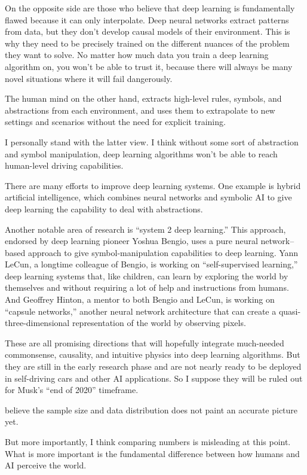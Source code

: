 On the opposite side are those who believe that deep learning is fundamentally flawed because it can only interpolate. Deep neural networks extract patterns from data, but they don’t develop causal models of their environment. This is why they need to be precisely trained on the different nuances of the problem they want to solve. No matter how much data you train a deep learning algorithm on, you won’t be able to trust it, because there will always be many novel situations where it will fail dangerously.

The human mind on the other hand, extracts high-level rules, symbols, and abstractions from each environment, and uses them to extrapolate to new settings and scenarios without the need for explicit training.

I personally stand with the latter view. I think without some sort of abstraction and symbol manipulation, deep learning algorithms won’t be able to reach human-level driving capabilities.

There are many efforts to improve deep learning systems. One example is hybrid artificial intelligence, which combines neural networks and symbolic AI to give deep learning the capability to deal with abstractions.

Another notable area of research is “system 2 deep learning.” This approach, endorsed by deep learning pioneer Yoshua Bengio, uses a pure neural network–based approach to give symbol-manipulation capabilities to deep learning. Yann LeCun, a longtime colleague of Bengio, is working on “self-supervised learning,” deep learning systems that, like children, can learn by exploring the world by themselves and without requiring a lot of help and instructions from humans. And Geoffrey Hinton, a mentor to both Bengio and LeCun, is working on “capsule networks,” another neural network architecture that can create a quasi-three-dimensional representation of the world by observing pixels.

These are all promising directions that will hopefully integrate much-needed commonsense, causality, and intuitive physics into deep learning algorithms. But they are still in the early research phase and are not nearly ready to be deployed in self-driving cars and other AI applications. So I suppose they will be ruled out for Musk’s “end of 2020” timeframe.

believe the sample size and data distribution does not paint an accurate picture yet.

But more importantly, I think comparing numbers is misleading at this point. What is more important is the fundamental difference between how humans and AI perceive the world.

